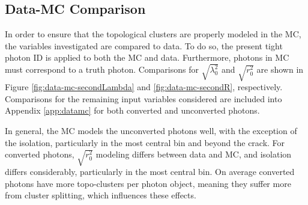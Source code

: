 \subsection{Data-MC Comparison} \label{ssec:yid-datamc}
In order to ensure that the topological clusters are properly modeled in the \gls{MC}, the variables investigated are compared to data. To do so, the present tight photon ID is applied to both the \gls{MC} and data. Furthermore, photons in \gls{MC} must correspond to a truth photon. Comparisons for $\sqrt{\lambda_{0}^2}$ and $\sqrt{r_{0}^2}$ are shown in Figure \ref{fig:data-mc-secondLambda} and \ref{fig:data-mc-secondR}, respectively. Comparisons for the remaining input variables considered are included into Appendix \ref{app:datamc} for both converted and unconverted photons.

In general, the \gls{MC} models the unconverted photons well, with the exception of the isolation, particularly in the most central bin and beyond the crack. For converted photons, $\sqrt{r_{0}^2}$ modeling differs between data and \gls{MC}, and isolation differs considerably, particularly in the most central bin. On average converted photons have more topo-clusters per photon object, meaning they suffer more from cluster splitting, which influences these effects.


